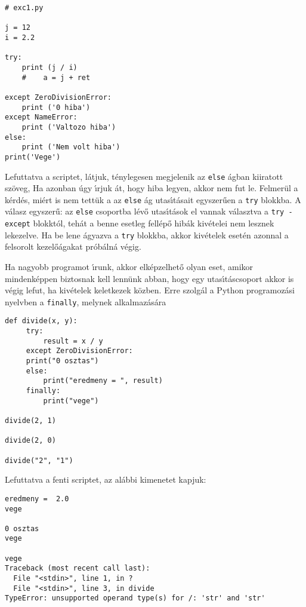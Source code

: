 \begin{Verbatim}[fontsize=\small]
# exc1.py

j = 12 
i = 2.2

try:
    print (j / i)
    #    a = j + ret
    
except ZeroDivisionError:
    print ('0 hiba')
except NameError:
    print ('Valtozo hiba')
else:
    print ('Nem volt hiba')
print('Vege')
\end{Verbatim}

Lefuttatva a scriptet, l\'atjuk, t\'enylegesen megjelenik az {\tt else} \'agban kiiratott sz\"oveg, Ha azonban \'ugy 
\'{\i}rjuk \'at, hogy hiba legyen, akkor nem fut le. Felmer\"ul a k\'erd\'es, mi\'ert is nem tett\"uk a az {\tt else} 
\'ag utas\'{\i}t\'asait egyszer\H{u}en a {\tt try} blokkba. A v\'alasz egyszer\H{u}: az {\tt else} csoportba l\'ev\H{o} 
utas\'{\i}t\'asok el vannak v\'alasztva a {\tt try - except} blokkt\'ol, teh\'at a benne esetleg fell\'ep\H{o} hib\'ak 
kiv\'etelei nem lesznek lekezelve. Ha be lene \'agyazva a {\tt try} blokkba, akkor kiv\'etelek eset\'en azonnal a 
felsorolt kezel\H{o}\'agakat pr\'ob\'aln\'a v\'egig.

Ha nagyobb programot \'{\i}runk, akkor elk\'epzelhet\H{o} olyan eset, amikor mindenk\'eppen biztosnak kell lenn\"unk 
abban, hogy egy utas\'{\i}t\'ascsoport akkor is v\'egig lefut, ha kiv\'etelek keletkezek k\"ozben. Erre szolg\'al a 
Python programoz\'asi nyelvben a {\tt finally}, melynek alkalmaz\'as\'ara 

\begin{Verbatim}[fontsize=\small]
def divide(x, y):
     try:
         result = x / y
     except ZeroDivisionError:
	 print("0 osztas")
     else:
         print("eredmeny = ", result)
     finally:
         print("vege")

divide(2, 1)

divide(2, 0)

divide("2", "1")
\end{Verbatim}

Lefuttatva a fenti scriptet, az al\'abbi kimenetet kapjuk:

\begin{Verbatim}[fontsize=\small]	 
eredmeny =  2.0
vege

0 osztas
vege

vege
Traceback (most recent call last):
  File "<stdin>", line 1, in ?
  File "<stdin>", line 3, in divide
TypeError: unsupported operand type(s) for /: 'str' and 'str'
\end{Verbatim}

